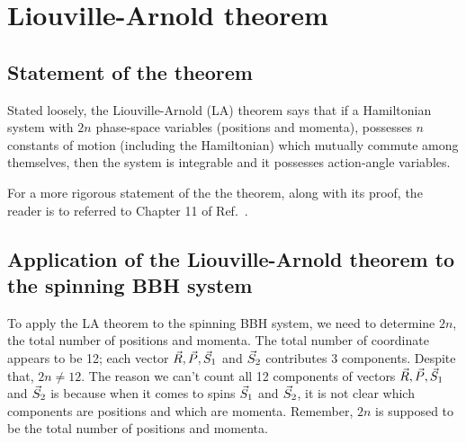 \section{Liouville-Arnold theorem}


\subsection{Statement of the theorem}

Stated loosely, the Liouville-Arnold (LA) theorem  says that if a Hamiltonian system with
$2 n$ phase-space variables (positions and momenta), possesses $n$ constants of motion (including the
Hamiltonian)
which mutually commute among themselves, then the system is integrable and it possesses action-angle variables.





\hfill \break


\begin{definition}[label=def:A]
For  a more rigorous statement of the the theorem, along with its
proof, the reader is to referred to Chapter 11 of Ref.~\cite{fasano}.
\end{definition}

\hfill \break



\subsection{Application of the Liouville-Arnold theorem to the spinning BBH system}


To apply the LA theorem to the spinning BBH system, we need to determine
$2n$, the total number of positions and momenta. The total number of coordinate
appears to be 12; each vector $\vec{R}, \vec{P}, \vec{S}_1$ and $\vec{S}_2$
contributes 3 components. Despite that, $2n \neq 12$.
The reason we can't count all 12 components of vectors 
$\vec{R}, \vec{P}, \vec{S}_1$ and $\vec{S}_2$
is because when it comes to spins $\vec{S}_1$ and $\vec{S}_2$, 
it is not clear which components are positions and which are momenta. 
Remember, $2n$ is supposed to be the total number of positions and momenta.



